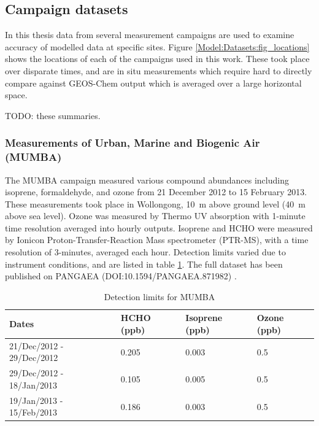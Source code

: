   
  \subsection{Campaign datasets}
  
    In this thesis data from several measurement campaigns are used to examine accuracy of modelled data at specific sites.
    Figure \ref{Model:Datasets:fig_locations} shows the locations of each of the campaigns used in this work.
    These took place over disparate times, and are in situ measurements which require hard to directly compare against GEOS-Chem output which is averaged over a large horizontal space.
    
    
    TODO: these summaries.
    

    
    \subsubsection{Measurements of Urban, Marine and Biogenic Air (MUMBA)}
    \label{Model:Datasets:MUMBA}
    
    The MUMBA campaign \parencite{PatonWalsh2017} measured various compound abundances including isoprene, formaldehyde, and ozone from 21 December 2012 to 15 February 2013.
    These measurements took place in Wollongong, 10~m above ground level (40~m above sea level).
    Ozone was measured by Thermo UV absorption with 1-minute time resolution averaged into hourly outputs.
    Isoprene and HCHO were measured by Ionicon Proton-Transfer-Reaction Mass spectrometer (PTR-MS), with a time resolution of 3-minutes, averaged each hour.
    Detection limits varied due to instrument conditions, and are listed in table \ref{Model:Datasets:MUMBA:tab_detectionlimits}.
    The full dataset has been published on PANGAEA (DOI:10.1594/PANGAEA.871982) \parencite{Guerette2018}.
    
    
    \begin{table}
      \caption{Detection limits for MUMBA}
      \begin{tabular}{  l |  l  l  l }
        
        \textbf{Dates} & \textbf{HCHO (ppb)} & \textbf{Isoprene (ppb)} & \textbf{Ozone (ppb)}
        \\ \hline
        21/Dec/2012 - 29/Dec/2012 & 0.205 & 0.003 & 0.5 \\
        29/Dec/2012 - 18/Jan/2013 & 0.105 & 0.005 & 0.5 \\
        19/Jan/2013 - 15/Feb/2013 & 0.186 & 0.003 & 0.5 \\
      \end{tabular}
      \label{Model:Datasets:MUMBA:tab_detectionlimits}
    \end{table}
    
